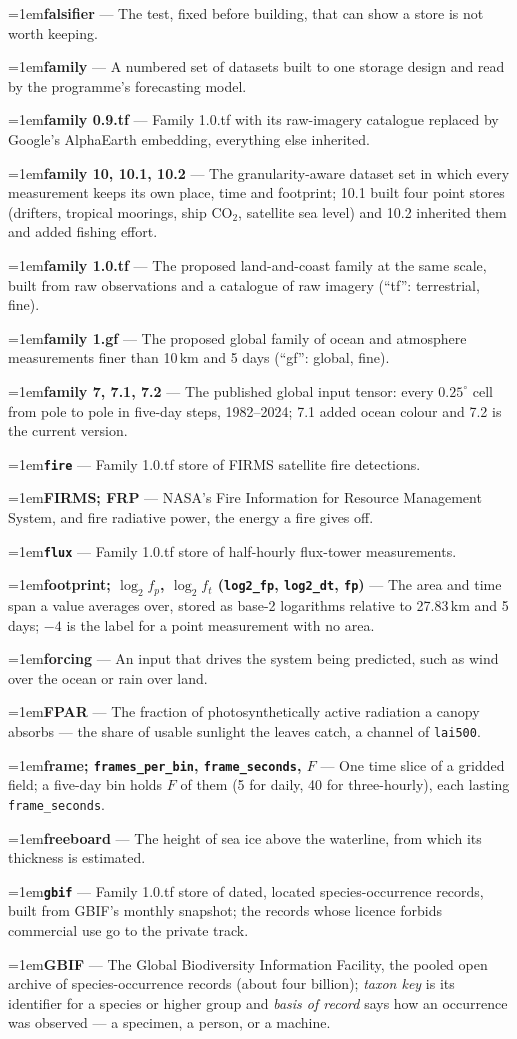 \documentclass[10pt]{article}
\newcommand{\code}[1]{\texttt{#1}}
\newcommand{\gl}[2]{\par\hangindent=1em\hangafter=1\textbf{#1} --- #2\par}
\begin{document}
\gl{falsifier}{The test, fixed before building, that can show a store is not worth keeping.}
\gl{family}{A numbered set of datasets built to one storage design and read by the programme's forecasting model.}
\gl{family 0.9.tf}{Family 1.0.tf with its raw-imagery catalogue replaced by Google's AlphaEarth embedding, everything else inherited.}
\gl{family 10, 10.1, 10.2}{The granularity-aware dataset set in which every measurement keeps its own place, time and footprint; 10.1 built four point stores (drifters, tropical moorings, ship CO$_2$, satellite sea level) and 10.2 inherited them and added fishing effort.}
\gl{family 1.0.tf}{The proposed land-and-coast family at the same scale, built from raw observations and a catalogue of raw imagery (``tf'': terrestrial, fine).}
\gl{family 1.gf}{The proposed global family of ocean and atmosphere measurements finer than 10\,km and 5 days (``gf'': global, fine).}
\gl{family 7, 7.1, 7.2}{The published global input tensor: every $0.25^\circ$ cell from pole to pole in five-day steps, 1982--2024; 7.1 added ocean colour and 7.2 is the current version.}
\gl{\code{fire}}{Family 1.0.tf store of FIRMS satellite fire detections.}
\gl{FIRMS; FRP}{NASA's Fire Information for Resource Management System, and fire radiative power, the energy a fire gives off.}
\gl{\code{flux}}{Family 1.0.tf store of half-hourly flux-tower measurements.}
\gl{footprint; $\log_2 f_p$, $\log_2 f_t$ (\code{log2\_fp}, \code{log2\_dt}, \code{fp})}{The area and time span a value averages over, stored as base-2 logarithms relative to 27.83\,km and 5 days; $-4$ is the label for a point measurement with no area.}
\gl{forcing}{An input that drives the system being predicted, such as wind over the ocean or rain over land.}
\gl{FPAR}{The fraction of photosynthetically active radiation a canopy absorbs --- the share of usable sunlight the leaves catch, a channel of \code{lai500}.}
\gl{frame; \code{frames\_per\_bin}, \code{frame\_seconds}, $F$}{One time slice of a gridded field; a five-day bin holds $F$ of them (5 for daily, 40 for three-hourly), each lasting \code{frame\_seconds}.}
\gl{freeboard}{The height of sea ice above the waterline, from which its thickness is estimated.}
\gl{\code{gbif}}{Family 1.0.tf store of dated, located species-occurrence records, built from GBIF's monthly snapshot; the records whose licence forbids commercial use go to the private track.}
\gl{GBIF}{The Global Biodiversity Information Facility, the pooled open archive of species-occurrence records (about four billion); \emph{taxon key} is its identifier for a species or higher group and \emph{basis of record} says how an occurrence was observed --- a specimen, a person, or a machine.}
\end{document}
